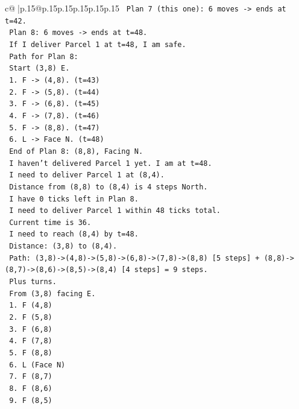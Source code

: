 \documentclass{article}
\begin{document}
{\begin{supertabular}{c@{$\;$}|p{.15\linewidth}@{}p{.15\linewidth}p{.15\linewidth}p{.15\linewidth}p{.15\linewidth}p{.15\linewidth}}
{{{\texttt{   Plan 7 (this one): 6 moves {-}> ends at t=42.} \\
\texttt{   Plan 8: 6 moves {-}> ends at t=48.} \\
\texttt{   If I deliver Parcel 1 at t=48, I am safe.} \\
\texttt{   Path for Plan 8:} \\
\texttt{   Start (3,8) E.} \\
\texttt{   1. F {-}> (4,8). (t=43)} \\
\texttt{   2. F {-}> (5,8). (t=44)} \\
\texttt{   3. F {-}> (6,8). (t=45)} \\
\texttt{   4. F {-}> (7,8). (t=46)} \\
\texttt{   5. F {-}> (8,8). (t=47)} \\
\texttt{   6. L {-}> Face N. (t=48)} \\
\texttt{   End of Plan 8: (8,8), Facing N.} \\
\texttt{   I haven't delivered Parcel 1 yet. I am at t=48.} \\
\texttt{   I need to deliver Parcel 1 at (8,4).} \\
\texttt{   Distance from (8,8) to (8,4) is 4 steps North.} \\
\texttt{   I have 0 ticks left in Plan 8.} \\
\texttt{   I need to deliver Parcel 1 within 48 ticks total.} \\
\texttt{   Current time is 36.} \\
\texttt{   I need to reach (8,4) by t=48.} \\
\texttt{   Distance: (3,8) to (8,4).} \\
\texttt{   Path: (3,8){-}>(4,8){-}>(5,8){-}>(6,8){-}>(7,8){-}>(8,8) {[}5 steps{]} + (8,8){-}>(8,7){-}>(8,6){-}>(8,5){-}>(8,4) {[}4 steps{]} = 9 steps.} \\
\texttt{   Plus turns.} \\
\texttt{   From (3,8) facing E.} \\
\texttt{   1. F (4,8)} \\
\texttt{   2. F (5,8)} \\
\texttt{   3. F (6,8)} \\
\texttt{   4. F (7,8)} \\
\texttt{   5. F (8,8)} \\
\texttt{   6. L (Face N)} \\
\texttt{   7. F (8,7)} \\
\texttt{   8. F (8,6)} \\
\texttt{   9. F (8,5)} \\
}}}
\end{supertabular}}
\end{document}
